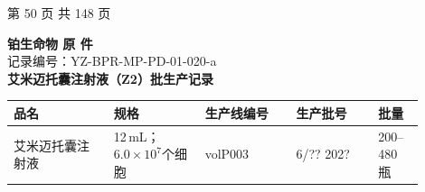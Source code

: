 \documentclass[UTF8,10pt,a4paper,fontset=fandol]{ctexart}
\newcommand{\fieldvalue}[1]{#1}
\newcommand{\handwritten}[1]{#1}
\begin{document}
\begin{center}
第 50 页 共 148 页
\end{center}

\newpage

\begin{center}
\textbf{铂生命物 原 件}\\
记录编号：YZ-BPR-MP-PD-01-020-a\\[2pt]
\textbf{艾米迈托囊注射液（Z2）批生产记录}
\end{center}

\begin{tabular}{|p{0.22\linewidth}|p{0.20\linewidth}|p{0.20\linewidth}|p{0.18\linewidth}|p{0.10\linewidth}|}
\hline
品名 & 规格 & 生产线编号 & 生产批号 & 批量\\
\hline
艾米迈托囊注射液 & 12\,mL；$6.0\times10^{7}$个细胞 &
\fieldvalue{\handwritten{volP003}} &
\fieldvalue{\handwritten{6/?? 202?}} &
200--480 瓶\\
\hline
\end{tabular}

\vspace{2pt}
\end{document}
